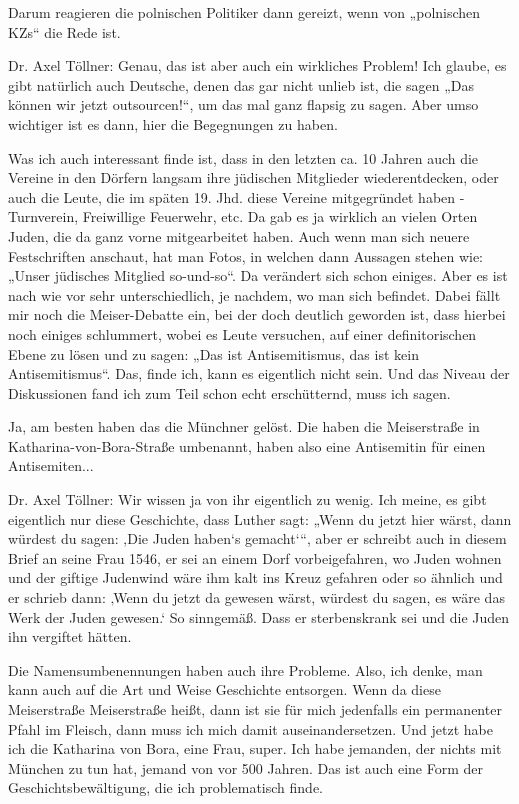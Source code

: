  
Darum reagieren die polnischen Politiker dann gereizt, wenn von „polnischen KZs“ die Rede ist. 

 
Dr. Axel Töllner: Genau, das ist aber auch ein wirkliches Problem! Ich glaube, es gibt natürlich auch Deutsche, denen das gar nicht unlieb ist, die sagen „Das können wir jetzt outsourcen!“, um das mal ganz flapsig zu sagen. Aber umso wichtiger ist es dann, hier die Begegnungen zu haben. 

Was ich auch interessant finde ist, dass in den letzten ca. 10 Jahren auch die Vereine in den Dörfern langsam ihre jüdischen Mitglieder wiederentdecken, oder auch die Leute, die im späten 19. Jhd. diese Vereine mitgegründet haben - Turnverein, Freiwillige Feuerwehr, etc. Da gab es ja wirklich an vielen Orten Juden, die da ganz vorne mitgearbeitet haben. Auch wenn man sich neuere Festschriften anschaut, hat man Fotos, in welchen dann Aussagen stehen wie: „Unser jüdisches Mitglied so-und-so“. Da verändert sich schon einiges. Aber es ist nach wie vor sehr unterschiedlich, je nachdem, wo man sich befindet. 
Dabei fällt mir noch die Meiser-Debatte ein, bei der doch deutlich geworden ist, dass hierbei noch einiges schlummert, wobei es Leute versuchen, auf einer definitorischen Ebene zu lösen und zu sagen: „Das ist Antisemitismus, das ist kein Antisemitismus“. Das, finde ich, kann es eigentlich nicht sein. Und das Niveau der Diskussionen fand ich zum Teil schon echt erschütternd, muss ich sagen. 

 
Ja, am besten haben das die Münchner gelöst. Die haben die Meiserstraße in Katharina-von-Bora-Straße umbenannt, haben also eine Antisemitin für einen Antisemiten... 

 
Dr. Axel Töllner: Wir wissen ja von ihr eigentlich zu wenig. Ich meine, es gibt eigentlich nur diese Geschichte, dass Luther sagt: „Wenn du jetzt hier wärst, dann würdest du sagen: ‚Die Juden haben‘s gemacht‘“, aber er schreibt auch in diesem Brief an seine Frau 1546, er sei an einem Dorf vorbeigefahren, wo Juden wohnen und der giftige Judenwind wäre ihm kalt ins Kreuz gefahren oder so ähnlich und er schrieb dann: ‚Wenn du jetzt da gewesen wärst, würdest du sagen, es wäre das Werk der Juden gewesen.‘ So sinngemäß. Dass er sterbenskrank sei und die Juden ihn vergiftet hätten. 

Die Namensumbenennungen haben auch ihre Probleme. Also, ich denke, man kann auch auf die Art und Weise Geschichte entsorgen. Wenn da diese Meiserstraße Meiserstraße heißt, dann ist sie für mich jedenfalls ein permanenter Pfahl im Fleisch, dann muss ich mich damit auseinandersetzen. Und jetzt habe ich die Katharina von Bora, eine Frau, super. Ich habe jemanden, der nichts mit München zu tun hat, jemand von vor 500 Jahren. Das ist auch eine Form der Geschichtsbewältigung, die ich problematisch finde. 

